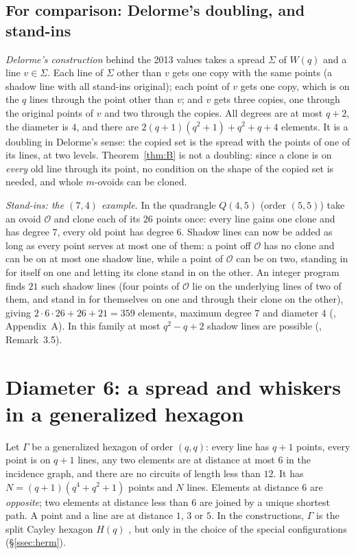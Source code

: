\documentclass[11pt]{amsart}
\theoremstyle{definition}
\theoremstyle{remark}
\newcommand{\cO}{\mathcal{O}}
\begin{document}
\subsection{For comparison: Delorme's doubling, and stand-ins}\label{ssec:delorme4}
\emph{Delorme's construction} behind the 2013 values \cite{D85a} takes a spread $\Sigma$ of $W(q)$ and a line $v\in\Sigma$. Each line of $\Sigma$ other than $v$ gets one copy with the same points (a shadow line with all stand-ins original); each point of $v$ gets one copy, which is on the $q$ lines through the point other than $v$; and $v$ gets three copies, one through the original points of $v$ and two through the copies. All degrees are at most $q+2$, the diameter is $4$, and there are $2(q+1)(q^2+1)+q^2+q+4$ elements. It is a doubling in Delorme's sense: the copied set is the spread with the points of one of its lines, at two levels. Theorem~\ref{thm:B} is not a doubling: since a clone is on \emph{every} old line through its point, no condition on the shape of the copied set is needed, and whole $m$-ovoids can be cloned.

\emph{Stand-ins: the $(7,4)$ example.} In the quadrangle $Q(4,5)$ (order $(5,5)$) take an ovoid $\cO$ and clone each of its $26$ points once: every line gains one clone and has degree $7$, every old point has degree $6$. Shadow lines can now be added as long as every point serves at most one of them: a point off $\cO$ has no clone and can be on at most one shadow line, while a point of $\cO$ can be on two, standing in for itself on one and letting its clone stand in on the other. An integer program finds $21$ such shadow lines (four points of $\cO$ lie on the underlying lines of two of them, and stand in for themselves on one and through their clone on the other), giving $2\cdot6\cdot26+26+21=359$ elements, maximum degree $7$ and diameter $4$ (, Appendix~A). In this family at most $q^2-q+2$ shadow lines are possible (, Remark~3.5).

\section{Diameter 6: a spread and whiskers in a generalized hexagon}\label{sec:d6}

Let $\Gamma$ be a generalized hexagon of order $(q,q)$: every line has $q+1$ points, every point is on $q+1$ lines, any two elements are at distance at most $6$ in the incidence graph, and there are no circuits of length less than $12$. It has $N=(q+1)(q^4+q^2+1)$ points and $N$ lines. Elements at distance $6$ are \emph{opposite}; two elements at distance less than $6$ are joined by a unique shortest path. A point and a line are at distance $1$, $3$ or $5$. In the constructions, $\Gamma$ is the split Cayley hexagon $H(q)$ \cite{T59,VM98}, but only in the choice of the special configurations (\S\ref{ssec:herm}).
\end{document}
